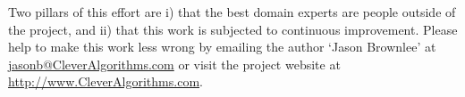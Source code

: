 \documentclass[a4paper, 11pt]{article}
\makeatletter
\newcommand{\myreportauthor}{Jason Brownlee}
\newcommand{\myreportemail}{jasonb@CleverAlgorithms.com}
\newcommand{\myreportwebsite}{http://www.CleverAlgorithms.com}
\makeatother
\begin{document}
Two pillars of this effort are i) that the best domain experts are people outside of the project, and ii) that this work is subjected to continuous improvement. 
Please help to make this work less wrong by emailing the author `\myreportauthor' at \url{\myreportemail} or visit the project website at \url{\myreportwebsite}.



\end{document}
